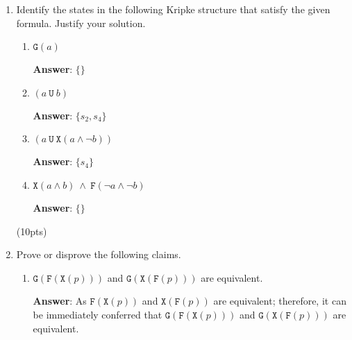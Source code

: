 \documentclass[11pt]{article}
\newcommand{\lx}[1]{\texttt{X}(#1)}
\newcommand{\lf}[1]{\texttt{F}(#1)}
\newcommand{\llg}[1]{\texttt{G}(#1)}
\newcommand{\lu}[2]{(#1\ \texttt{U}\ #2)}
\begin{document}
\begin{enumerate}
  
\item 
 Identify the states in the following Kripke structure that satisfy
  the given formula. Justify your solution.

\begin{center}
        \end{center}

\begin{enumerate}
\item $\llg{a}$ 

\textbf{Answer}: $\{\}$
\item $\lu{a}{b}$ 

\textbf{Answer}: $\{s_2, s_4\}$

\item $\lu{a}{\lx{a \land \neg b}}$ 

\textbf{Answer}: $\{s_4\}$


  \item $\lx{a\land b}\ \land\ \lf{\neg a \land \neg b}$ 

  \textbf{Answer}: $\{\} $

  
    \end{enumerate}
\hfill(10pts)

\item Prove or disprove the following claims. 
\begin{enumerate}
\item $\llg{\lf{\lx{p}}}$ and $\llg{\lx{\lf{p}}}$ are equivalent.

\textbf{Answer}: As $\lf{\lx{p}}$ and $\lx{\lf{p}}$ are equivalent; therefore, it can be immediately  conferred that $\llg{\lf{\lx{p}}}$ and $\llg{\lx{\lf{p}}}$ are equivalent.


\end{enumerate}
\end{enumerate}
\end{document}
